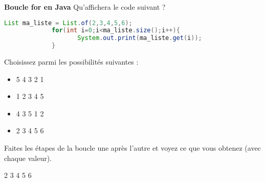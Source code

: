    
    \begin{Exercice}[5 minutes] \textbf{Boucle for en Java}
      	Qu'affichera le code suivant ?
      	
      	\begin{lstlisting}[language=Java]
             List ma_liste = List.of(2,3,4,5,6);
             for(int i=0;i<ma_liste.size();i++){
            		System.out.print(ma_liste.get(i));
             }
        	 \end{lstlisting}
             	
        Choisissez parmi les possibilités suivantes :
        
        \begin{itemize}
        
        \item 5 
        4 
        3 
        2 
        1 
        \item 1  
        2 
        3 
        4 
        5 
        \item 4 
        3 
        5 
        1 
        2 
        \item 2 
        3 
        4 
        5 
        6
        \end{itemize}
    
        \begin{conseil}
		   Faites les étapes de la boucle une après l'autre et voyez ce que vous obtenez (avec chaque valeur).  
        \end{conseil}
        
        \begin{solution}
            2 
            3 
            4 
            5 
            6
        \end{solution}
    \end{Exercice} 	
    
